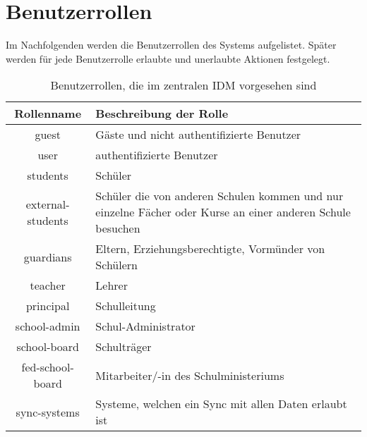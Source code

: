 \section{Benutzerrollen}
Im Nachfolgenden werden die Benutzerrollen des Systems aufgelistet. 
Später werden für jede Benutzerrolle erlaubte und unerlaubte Aktionen festgelegt.


\begin{table}[htb]
	\begin{tabularx}{\textwidth}{|c|X|}
		\hline
\textbf{Rollenname} & \textbf{Beschreibung der Rolle} \\ \hline
guest & Gäste und nicht authentifizierte Benutzer \\ \hline
user & authentifizierte Benutzer \\ \hline
students & Schüler \\ \hline
external-students & Schüler die von anderen Schulen kommen und nur einzelne Fächer oder Kurse an einer anderen Schule besuchen \\ \hline
guardians & Eltern, Erziehungsberechtigte, Vormünder von Schülern \\ \hline
teacher & Lehrer \\ \hline
principal & Schulleitung \\ \hline
school-admin & Schul-Administrator \\ \hline
school-board & Schulträger \\ \hline
fed-school-board & Mitarbeiter/-in des Schulministeriums \\ \hline
sync-systems & Systeme, welchen ein Sync mit allen Daten erlaubt ist \\ \hline

	\end{tabularx}

		\caption{Benutzerrollen, die im zentralen IDM vorgesehen sind}
		\label{tab:intro:roles}
\end{table}